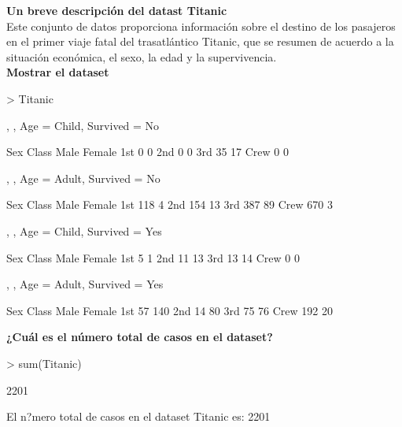 \documentclass[6pt]{report}
\begin{document}
\textbf{Un breve descripción del datast Titanic}\\
Este conjunto de datos proporciona información sobre el destino de los pasajeros en el primer viaje fatal del trasatlántico Titanic, que se resumen de acuerdo a la situación económica, el sexo, la edad y la supervivencia.\\

\textbf{Mostrar el dataset}
\begin{Schunk}
\begin{Sinput}
> Titanic
\end{Sinput}
\begin{Soutput}
, , Age = Child, Survived = No

      Sex
Class  Male Female
  1st     0      0
  2nd     0      0
  3rd    35     17
  Crew    0      0

, , Age = Adult, Survived = No

      Sex
Class  Male Female
  1st   118      4
  2nd   154     13
  3rd   387     89
  Crew  670      3

, , Age = Child, Survived = Yes

      Sex
Class  Male Female
  1st     5      1
  2nd    11     13
  3rd    13     14
  Crew    0      0

, , Age = Adult, Survived = Yes

      Sex
Class  Male Female
  1st    57    140
  2nd    14     80
  3rd    75     76
  Crew  192     20
\end{Soutput}
\end{Schunk}

\textbf{¿Cuál es el número total de casos en el dataset?}
\begin{Schunk}
\begin{Sinput}
> sum(Titanic)
\end{Sinput}
\begin{Soutput}
[1] 2201
\end{Soutput}
\end{Schunk}
El n?mero total de casos en el dataset Titanic es: 2201
\end{document}
